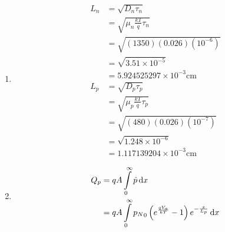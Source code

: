 \documentclass[fleqn, a4paper, 10pt, oneside]{amsart}
\theoremstyle{definition}
\theoremstyle{theorem}
\begin{document}
\begin{solution}
\begin{enumerate}[leftmargin=*]
\begin{figure}[H]
			\end{figure}
		\item
			\begin{align*}
				L_n & = \sqrt{D_n \tau_n}                            \\
                                    & = \sqrt{\mu_n \frac{k T}{q} \tau_n}            \\
                                    & = \sqrt{(1350) (0.026) \left( 10^{-6} \right)} \\
                                    & = \sqrt{3.51 \times 10^{-5}}                   \\
                                    & = 5.924525297 \times 10^{-3} \si{\centi\metre} \\
				L_p & = \sqrt{D_p \tau_p}                            \\
                                    & = \sqrt{\mu_p \frac{k T}{q} \tau_p}            \\
                                    & = \sqrt{(480) (0.026) \left( 10^{-7} \right)}  \\
                                    & = \sqrt{1.248 \times 10^{-6}}                  \\
                                    & = 1.117139204 \times 10^{-3} \si{\centi\metre}
			\end{align*}
		\item
			\begin{align*}
				Q_p & = q A \int\limits_{0}^{\infty} \hat{p} \dif x                                                                                                               \\
                                    & = q A \int\limits_{0}^{\infty} {p_N}_0 \left( e^{\frac{q V_a}{k T}} - 1 \right) e^{-\frac{x}{L_p}} \dif x                                                   \\

\end{align*}
\end{enumerate}
\end{solution}
\end{document}
